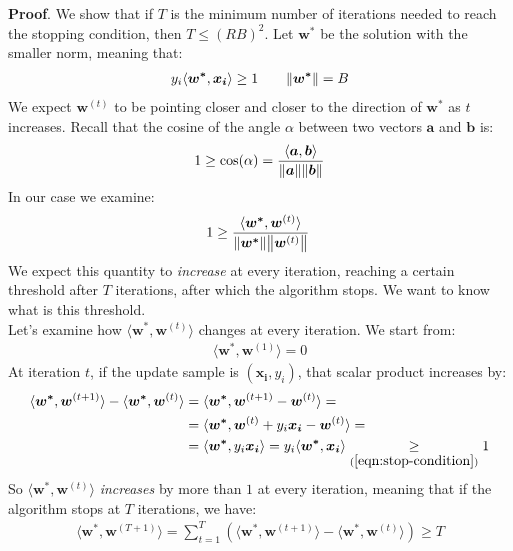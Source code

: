 \documentclass[../template.tex]{subfiles}
\begin{document}
\begin{itemize}
\textbf{Proof}. We show that if $T$ is the minimum number of iterations needed to reach the stopping condition, then $T \leq (RB)^2$. Let $\bm{w^*}$ be the solution with the smaller norm, meaning that:
\begin{align} \label{eqn:stop-condition}
    y_i \langle \bm{w^*}, \bm{x_i} \rangle \geq 1 \qquad \norm{\bm{w^*}} = B
\end{align}
We expect $\bm{w}^{(t)}$ to be pointing closer and closer to the direction of $\bm{w^*}$ as $t$ increases. Recall that the cosine of the angle $\alpha$ between two vectors $\bm{a}$ and $\bm{b}$ is:
\begin{align*}
    1 \geq \cos(\alpha) =\frac{\langle \bm{a}, \bm{b} \rangle}{\norm{\bm{a}}\norm{\bm{b}}}
\end{align*}
In our case we examine:
\begin{align*}
    1 \geq\frac{\langle \bm{w^*}, \bm{w}^{(t)} \rangle}{\norm{\bm{w^*}} \norm{\bm{w}^{(t)}}} \frac{}{}  
\end{align*}
We expect this quantity to \textit{increase} at every iteration, reaching a certain threshold after $T$ iterations, after which the algorithm stops. We want to know what is this threshold.\\

Let's examine how $\langle \bm{w^*}, \bm{w}^{(t)} \rangle$ changes at every iteration. We start from:
\begin{align*}
    \langle \bm{w^*}, \bm{w}^{(1)} \rangle = 0
\end{align*}
At iteration $t$, if the update sample is $(\bm{x_i}, y_i)$, that scalar product increases by:
\begin{align*}
    \langle \bm{w^*}, \bm{w}^{(t+1)} \rangle - \langle \bm{w^*}, \bm{w}^{(t)} \rangle &= \langle \bm{w^*}, \bm{w}^{(t+1)} - \bm{w}^{(t)} \rangle =\\
    &= \langle \bm{w^*},    \bm{w}^{(t)} + y_i \bm{x_i}- \bm{w}^{(t)} \rangle =\\
    &= \langle \bm{w^*}, y_i \bm{x_i} \rangle = y_i \langle \bm{w^*}, \bm{x_i} \rangle \underset{(\ref{eqn:stop-condition})}{\geq}  1
\end{align*}
So $\langle \bm{w^*}, \bm{w}^{(t)} \rangle$ \textit{increases} by more than $1$ at every iteration, meaning that if the algorithm stops at $T$ iterations, we have:
\begin{align*}
    \langle \bm{w^*}, \bm{w}^{(T+1)} \rangle = \sum_{t=1}^T \left( \langle \bm{w^*}, \bm{w}^{(t+1)} \rangle - \langle \bm{w^*}, \bm{w}^{(t)} \rangle  \right) \geq T
\end{align*}


\end{itemize}
\end{document}
